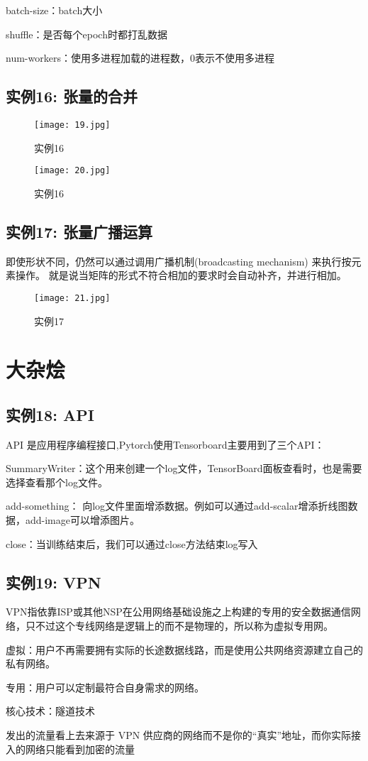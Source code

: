 \documentclass[a4paper, 12pt]{article}
\begin{document}
batch-size：batch大小\par

shuffle：是否每个epoch时都打乱数据\par

num-workers：使用多进程加载的进程数，0表示不使用多进程
          \subsection{实例16: 张量的合并}
          \begin{figure}[h!]
            \centering
            \texttt{[image: 19.jpg]}
            \caption{实例16}
          \end{figure}
          \begin{figure}[h!]
            \centering
            \texttt{[image: 20.jpg]}
            \caption{实例16}
          \end{figure}
          \subsection{实例17: 张量广播运算}
          即使形状不同，仍然可以通过调用广播机制(broadcasting mechanism) 来执行按元素操作。
            就是说当矩阵的形式不符合相加的要求时会自动补齐，并进行相加。
            \begin{figure}[h!]
                \centering
                \texttt{[image: 21.jpg]}
                \caption{实例17}
              \end{figure}
              \section{大杂烩}
              \subsection{实例18: API}
              \noindent API 是应用程序编程接口,Pytorch使用Tensorboard主要用到了三个API：\par
              SummaryWriter：这个用来创建一个log文件，TensorBoard面板查看时，也是需要选择查看那个log文件。\par
              add-something： 向log文件里面增添数据。例如可以通过add-scalar增添折线图数据，add-image可以增添图片。\par
              close：当训练结束后，我们可以通过close方法结束log写入
              \subsection{实例19: VPN}
              \noindent VPN指依靠ISP或其他NSP在公用网络基础设施之上构建的专用的安全数据通信网络，只不过这个专线网络是逻辑上的而不是物理的，所以称为虚拟专用网。\par
虚拟：用户不再需要拥有实际的长途数据线路，而是使用公共网络资源建立自己的私有网络。\par
专用：用户可以定制最符合自身需求的网络。\par
核心技术：隧道技术\par
发出的流量看上去来源于 VPN 供应商的网络而不是你的“真实”地址，而你实际接入的网络只能看到加密的流量
\end{document}

